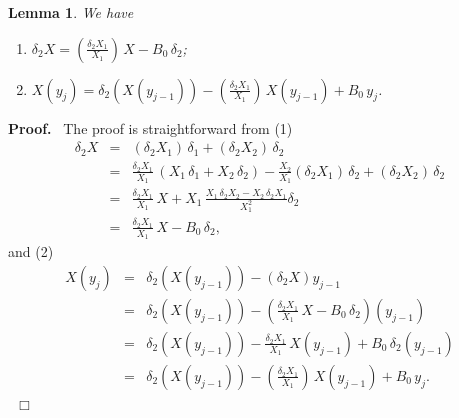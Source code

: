 \documentclass[preprint, 12pt]{elsarticle}
\newtheorem{lem}[thm]{Lemma}
\numberwithin{equation}{section}
\newenvironment{proof}[1][Proof]{\textbf{#1.}\ }{\ $\Box$}
\begin{document}
\begin{lem}
\label{lem:a.1}We have
\begin{enumerate} 
\item[(1).] $\delta_2X =
(\frac{\delta_2 X_1}{X_1})\,X - B_0\,\delta_2$; 
\item[(2).] $X(y_j) =
\delta_2(X(y_{j-1})) - (\frac{\delta_2 X_1}{X_1})\,X(y_{j-1}) +
B_0\,y_j$.
\end{enumerate}
\end{lem}
\begin{proof}
The proof is straightforward from (1)
\begin{eqnarray*} \delta_2X &=& (\delta_2X_1)\,\delta_1 +
(\delta_2X_2)\,\delta_2\\
&=&\frac{\delta_2 X_1}{X_1}\, (X_1\,\delta_1 + X_2\,\delta_2) -
\frac{X_2}{X_1} (\delta_2 X_1)\,\delta_2 + (\delta_2
X_2)\,\delta_2\\
&=&\frac{\delta_2 X_1}{X_1}\,X + X_1\,\frac{X_1\,\delta_2X_2 -
X_2\,\delta_2 X_1}{X_1^2}\delta_2\\
&=&\frac{\delta_2X_1}{X_1}\,X - B_0\,\delta_2,
\end{eqnarray*}
and (2)
\begin{eqnarray*}
X(y_j) &=& \delta_2(X(y_{j-1})) - (\delta_2 X)y_{j-1}\\
&=& \delta_2(X(y_{j-1})) - (\frac{\delta_2X_1}{X_1}\,X -
B_0\,\delta_2)(y_{j-1})\\
&=& \delta_2(X(y_{j-1})) - \frac{\delta_2X_1}{X_1}\,X(y_{j-1}) +
B_0\,\delta_2(y_{j-1})\\
&=&\delta_2(X(y_{j-1})) - (\frac{\delta_2 X_1}{X_1})\,X(y_{j-1}) +
B_0\,y_j.
\end{eqnarray*}
\end{proof}
\end{document}
